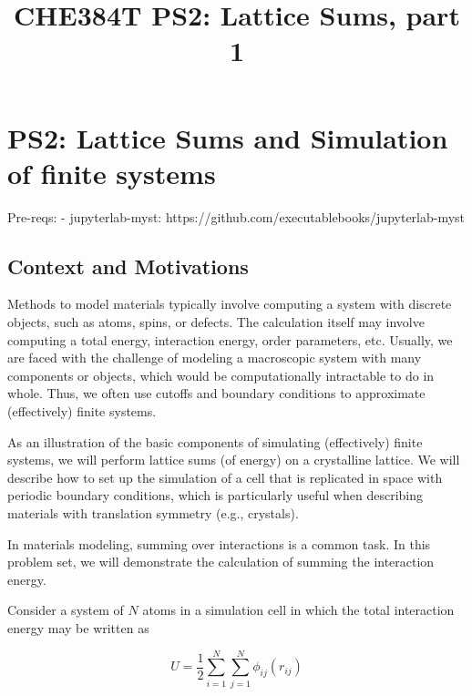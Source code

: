 \documentclass[11pt]{article}
\title{CHE384T PS2: Lattice Sums, part 1}
\begin{document}
    
    \maketitle
    
    

    
    \hypertarget{ps2-lattice-sums-and-simulation-of-finite-systems}{%
\section{PS2: Lattice Sums and Simulation of finite
systems}\label{ps2-lattice-sums-and-simulation-of-finite-systems}}

Pre-reqs: - jupyterlab-myst:
https://github.com/executablebooks/jupyterlab-myst

    \hypertarget{context-and-motivations}{%
\subsection{Context and Motivations}\label{context-and-motivations}}

Methods to model materials typically involve computing a system with
discrete objects, such as atoms, spins, or defects. The calculation
itself may involve computing a total energy, interaction energy, order
parameters, etc. Usually, we are faced with the challenge of modeling a
macroscopic system with many components or objects, which would be
computationally intractable to do in whole. Thus, we often use cutoffs
and boundary conditions to approximate (effectively) finite systems.

As an illustration of the basic components of simulating (effectively)
finite systems, we will perform lattice sums (of energy) on a
crystalline lattice. We will describe how to set up the simulation of a
cell that is replicated in space with periodic boundary conditions,
which is particularly useful when describing materials with translation
symmetry (e.g., crystals).

In materials modeling, summing over interactions is a common task. In
this problem set, we will demonstrate the calculation of summing the
interaction energy.

Consider a system of \(N\) atoms in a simulation cell in which the total
interaction energy may be written as

\begin{equation}
U = \frac{1}{2} \sum_{i=1}^N \sum_{j=1}^N \phi_{ij}(r_{ij})
\end{equation}
\end{document}
